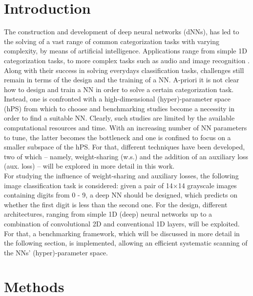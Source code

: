 \documentclass[a4paper, 12pt, conference]{article}
\begin{document}
\section{Introduction}
The construction and development of deep neural networks (dNNs), has led to the solving of a vast range of common categorization tasks with varying complexity, by means of artificial intelligence. Applications range from simple 1D categorization tasks, to more complex tasks such as audio and image recognition \cite{c1, c2, c3, c4}. Along with their success in solving everydays classification tasks, challenges still remain in terms of the design and the training of a NN. A-priori it is not clear how to design and train a NN in order to solve a certain categorization task. Instead, one is confronted with a high-dimensional (hyper)-parameter space (hPS) from which to choose and benchmarking studies become a necessity in order to find a suitable NN. Clearly, such studies are limited by the available computational resources and time. With an increasing number of NN parameters to tune, the latter becomes the bottleneck and one is confined to focus on a smaller subspace of the hPS. For that, different techniques have been developed, two of which -- namely, weight-sharing (w.s.) and the addition of an auxiliary loss (aux. loss) -- will be explored in more detail in this work.\\
For studying the influence of weight-sharing and auxiliary losses, the following image classification task is considered: given a pair of 14$\times$14 grayscale images containing digits from 0 - 9, a deep NN should be designed, which predicts on whether the first digit is less than the second one. For the design, different architectures, ranging from simple 1D (deep) neural networks up to a combination of convolutional 2D and conventional 1D layers, will be exploited.\\
For that, a benchmarking framework, which will be discussed in more detail in the following section, is implemented, allowing an efficient systematic scanning of the NNs' (hyper)-parameter space.


\section{Methods}
\end{document}

